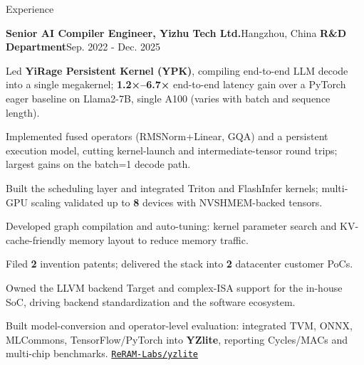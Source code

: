 \documentclass{resume} %
\newcommand{\repo}[2]{\href{#2}{\small\nolinkurl{#1}}}
\begin{document}
\begin{rSection}{Experience}
\begin{rSubsection}{\textbf{Senior AI Compiler Engineer, Yizhu Tech Ltd.}}{Hangzhou, China}
{\textbf{R\&D Department}}{Sep. 2022 - Dec. 2025}
\item {Led \textbf{YiRage Persistent Kernel (YPK)}, compiling end-to-end LLM decode into a single megakernel; \textbf{1.2×–6.7×} end-to-end latency gain over a PyTorch eager baseline on Llama2-7B, single A100 (varies with batch and sequence length).}\\
\item {Implemented fused operators (RMSNorm+Linear, GQA) and a persistent execution model, cutting kernel-launch and intermediate-tensor round trips; largest gains on the batch=1 decode path.}\\
\item {Built the scheduling layer and integrated Triton and FlashInfer kernels; multi-GPU scaling validated up to \textbf{8} devices with NVSHMEM-backed tensors.}\\
\item {Developed graph compilation and auto-tuning: kernel parameter search and KV-cache-friendly memory layout to reduce memory traffic.}\\
\item {Filed \textbf{2} invention patents; delivered the stack into \textbf{2} datacenter customer PoCs.}\\
\item {Owned the LLVM backend Target and complex-ISA support for the in-house SoC, driving backend standardization and the software ecosystem.}\\
\item {Built model-conversion and operator-level evaluation: integrated TVM, ONNX, MLCommons, TensorFlow/PyTorch into \textbf{YZlite}, reporting Cycles/MACs and multi-chip benchmarks. \repo{ReRAM-Labs/yzlite}{https://github.com/ReRAM-Labs/yzlite}}\\
\end{rSubsection}


\end{rSection}
\end{document}

